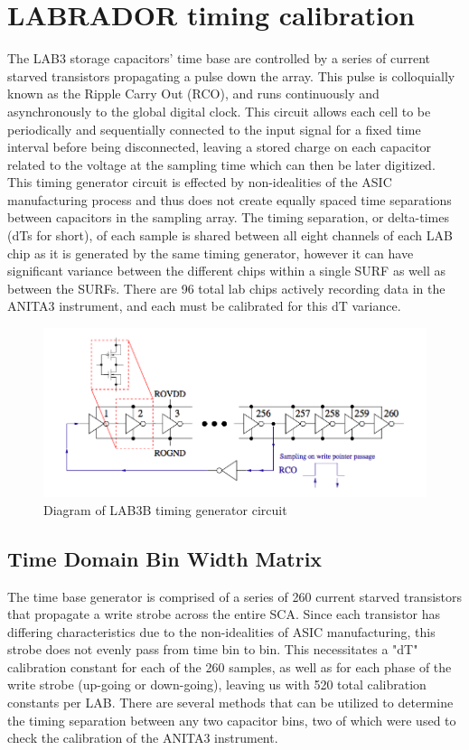 \section{LABRADOR timing calibration}
		The LAB3 storage capacitors' time base are controlled by a series of current starved transistors propagating a pulse down the array.  This pulse is colloquially known as the Ripple Carry Out (RCO), and runs continuously and asynchronously to the global digital clock.  This circuit allows each cell to be periodically and sequentially connected to the input signal for a fixed time interval before being disconnected, leaving a stored charge on each capacitor related to the voltage at the sampling time which can then be later digitized.  This timing generator circuit is effected by non-idealities of the ASIC manufacturing process and thus does not create equally spaced time separations between capacitors in the sampling array.  The timing separation, or delta-times (dTs for short), of each sample is shared between all eight channels of each LAB chip as it is generated by the same timing generator, however it can have significant variance between the different chips within a single SURF as well as between the SURFs.  There are 96 total lab chips actively recording data in the ANITA3 instrument, and each must be calibrated for this dT variance.

\noindent		
\begin{figure}
	\includegraphics[width=\textwidth]{figures/LAB3BTimingGenerator}
	\caption{Diagram of LAB3B timing generator circuit\cite{LABASICPAPER} }
	\label{fig:timingGenerator}
\end{figure}

	\subsection{Time Domain Bin Width Matrix}
		The time base generator is comprised of a series of 260 current starved transistors that propagate a write strobe across the entire SCA.  Since each transistor has differing characteristics due to the non-idealities of ASIC manufacturing, this strobe does not evenly pass from time bin to bin.  This necessitates a "dT" calibration constant for each of the 260 samples, as well as for each phase of the write strobe (up-going or down-going), leaving us with 520 total calibration constants per LAB.  There are several methods that can be utilized to determine the timing separation between any two capacitor bins, two of which were used to check the calibration of the ANITA3 instrument.
		
